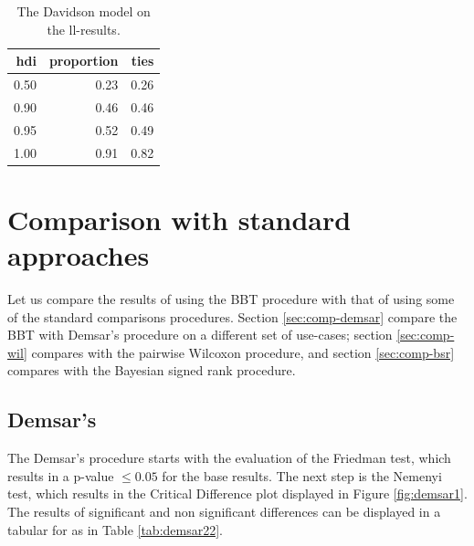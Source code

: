 \documentclass[twoside,11pt,preprint]{article}
\begin{document}
\begin{table}

\caption{\label{tab:ties2}\label{tab:tiesppc2} The Davidson model on the ll-results.}
\centering
\begin{tabular}[t]{rrr}
\toprule
\textbf{hdi} & \textbf{proportion} & \textbf{ties}\\
\midrule
0.50 & 0.23 & 0.26\\
0.90 & 0.46 & 0.46\\
0.95 & 0.52 & 0.49\\
1.00 & 0.91 & 0.82\\
\bottomrule
\end{tabular}
\end{table}

\hypertarget{comparison-with-standard-approaches}{%
\section{\texorpdfstring{Comparison with standard approaches \label{compare-tests}}{Comparison with standard approaches }}\label{comparison-with-standard-approaches}}

Let us compare the results of using the BBT procedure with that of using some of the standard comparisons procedures. Section \ref{sec:comp-demsar} compare the BBT with Demsar's procedure on a different set of use-cases; section \ref{sec:comp-wil} compares with the pairwise Wilcoxon procedure, and section \ref{sec:comp-bsr} compares with the Bayesian signed rank procedure.

\hypertarget{demsars}{%
\subsection{\texorpdfstring{Demsar's \label{sec:comp-demsar}}{Demsar's }}\label{demsars}}

The Demsar's procedure starts with the evaluation of the Friedman test, which results in a p-value \(\le 0.05\) for the base results.
The next step is the Nemenyi test, which results in the Critical Difference plot displayed in Figure \ref{fig:demsar1}.
The results of significant and non significant differences can be displayed in a tabular for as in
Table \ref{tab:demsar22}.
\end{document}
